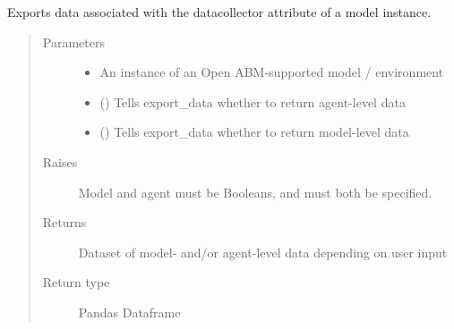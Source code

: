 \documentclass[letterpaper,10pt,english]{sphinxmanual}
\begin{document}
\begin{fulllineitems}
\label{\detokenize{index:oabm_tools.export_data}}
Exports data associated with the datacollector attribute of a model instance.
\begin{quote}\begin{description}
\item[{Parameters}] \leavevmode\begin{itemize}
\item {} 
 \textendash{} An instance of an Open ABM-supported model / environment

\item {} 
 () \textendash{} Tells export\_data whether to return agent-level data

\item {} 
 () \textendash{} Tells export\_data whether to return model-level data

\end{itemize}

\item[{Raises}] \leavevmode
{} \textendash{} Model and agent must be Booleans, and must both be specified.

\item[{Returns}] \leavevmode
Dataset of model- and/or agent-level data depending on user input

\item[{Return type}] \leavevmode
Pandas Dataframe

\end{description}\end{quote}

\end{fulllineitems}

\end{document}
